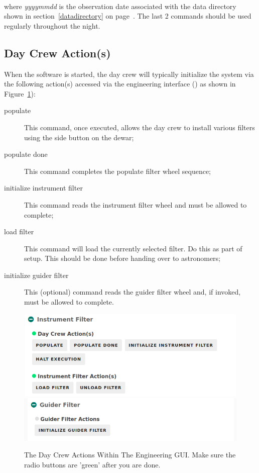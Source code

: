 \documentclass[12pt,twoside]{article}
\begin{document}



 \\

\noindent where \emph{yyyymmdd} is the observation date associated with the data directory shown in section~\ref{datadirectory} on page~\pageref{datadirectory}. The last 2 commands should be used regularly throughout the night.

\subsection{Day Crew Action(s)}
\label{daycrewactions}

\noindent When the software is started, the day crew will typically initialize the system via the following action(s)
accessed via the engineering interface () as shown in Figure~\ref{engineer}):

\begin{description}
 \item[{\sc populate}] This command, once executed, allows the day crew to install various filters using the side 
                       button on the dewar;
 \item[{\sc populate done}] This command completes the populate filter wheel sequence;
 \item[{\sc initialize instrument filter}] This command reads the instrument filter wheel and must be allowed to complete;
  \item[{\sc load filter}] This command will load the currently selected filter.  Do this as part of setup. This should be done before handing over to astronomers;
 \item[{\sc initialize guider filter}] This (optional) command reads the guider filter wheel and, if invoked, must be allowed 
                                       to complete.
\end{description}

\begin{figure}[!h]
 \centering
 \includegraphics[width=0.5\linewidth]{DayCrewActions1_v2.png}
 \includegraphics[width=0.5\linewidth]{DayCrewActions2.png}
 \caption{The Day Crew Actions Within The Engineering GUI. Make sure the radio buttons are 'green' after you are done.}
 \label{engineer}
\end{figure}
\end{document}
